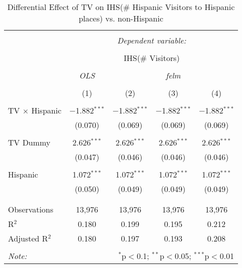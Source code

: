 
\begin{table}[!htbp] \centering 
  \caption{Differential Effect of TV on IHS(\# Hispanic Visitors to Hispanic places) vs. non-Hispanic} 
  \label{} 
\begin{tabular}{@{\extracolsep{-2pt}}lcccc} 
\\[-1.8ex]\hline 
\hline \\[-1.8ex] 
 & \multicolumn{4}{c}{\textit{Dependent variable:}} \\ 
\cline{2-5} 
\\[-1.8ex] & \multicolumn{4}{c}{IHS(\# Visitors)} \\ 
\\[-1.8ex] & \textit{OLS} & \multicolumn{3}{c}{\textit{felm}} \\ 
\\[-1.8ex] & (1) & (2) & (3) & (4)\\ 
\hline \\[-1.8ex] 
 TV $\times$ Hispanic & $-$1.882$^{***}$ & $-$1.882$^{***}$ & $-$1.882$^{***}$ & $-$1.882$^{***}$ \\ 
  & (0.070) & (0.069) & (0.069) & (0.069) \\ 
  & & & & \\ 
 TV Dummy & 2.626$^{***}$ & 2.626$^{***}$ & 2.626$^{***}$ & 2.626$^{***}$ \\ 
  & (0.047) & (0.046) & (0.046) & (0.046) \\ 
  & & & & \\ 
 Hispanic & 1.072$^{***}$ & 1.072$^{***}$ & 1.072$^{***}$ & 1.072$^{***}$ \\ 
  & (0.050) & (0.049) & (0.049) & (0.049) \\ 
  & & & & \\ 
\hline \\[-1.8ex] 
Observations & 13,976 & 13,976 & 13,976 & 13,976 \\ 
R$^{2}$ & 0.180 & 0.199 & 0.195 & 0.212 \\ 
Adjusted R$^{2}$ & 0.180 & 0.197 & 0.193 & 0.208 \\ 
\hline 
\hline \\[-1.8ex] 
\textit{Note:}  & \multicolumn{4}{r}{$^{*}$p$<$0.1; $^{**}$p$<$0.05; $^{***}$p$<$0.01} \\ 
\end{tabular} 
\end{table} 
